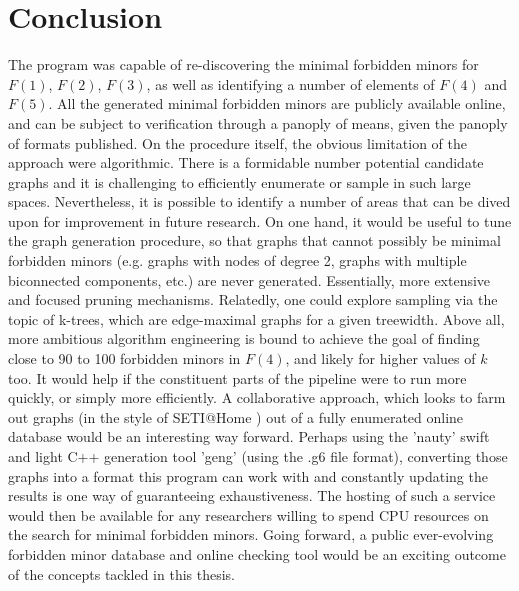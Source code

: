 \section{Conclusion}

The program was capable of re-discovering the minimal forbidden minors for $F(1)$, $F(2)$, $F(3)$, as well as identifying a number of elements of $F(4)$ and $F(5)$. All the generated minimal forbidden minors are publicly available online, and can be subject to verification through a panoply of means, given the panoply of formats published. On the procedure itself, the obvious limitation of the approach were algorithmic. There is a formidable number potential candidate graphs and it is challenging to efficiently enumerate or sample in such large spaces. Nevertheless, it is possible to identify a number of areas that can be dived upon for improvement in future research. On one hand, it would be useful to tune the graph generation procedure, so that graphs that cannot possibly be minimal forbidden minors (e.g. graphs with nodes of degree 2, graphs with multiple biconnected components, etc.) are never generated. Essentially, more extensive and focused pruning mechanisms. Relatedly, one could explore sampling via the topic of k-trees, which are edge-maximal graphs for a given treewidth. Above all, more ambitious algorithm engineering is bound to achieve the goal of finding close to 90 to 100 forbidden minors in $F(4)$, and likely for higher values of $k$ too. It would help if the constituent parts of the pipeline were to run more quickly, or simply more efficiently. A collaborative approach, which looks to farm out graphs (in the style of SETI@Home \cite{seti2002}) out of a fully enumerated online database would be an interesting way forward. Perhaps using the 'nauty' swift and light C++ generation tool 'geng' (using the .g6 file format), converting those graphs into a format this program can work with and constantly updating the results is one way of guaranteeing exhaustiveness. The hosting of such a service would then be available for any researchers willing to spend CPU resources on the search for minimal forbidden minors. Going forward, a public ever-evolving forbidden minor database and online checking tool would be an exciting outcome of the concepts tackled in this thesis.